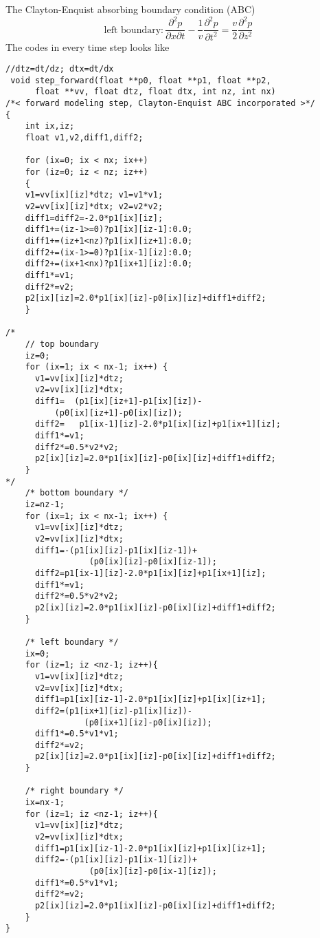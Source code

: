 The Clayton-Enquist absorbing boundary condition (ABC) \citep{Clayton_1977_ABC}
\begin{equation}
 \mbox{left boundary}:\frac{\partial^2 p}{\partial x\partial t}-\frac{1}{v}\frac{\partial^2 p}{\partial t^2}=\frac{v}{2}\frac{\partial^2 p}{\partial z^2}
\end{equation}
The codes in every time step looks like
\lstset{language=c,numbers=left,numberstyle=\tiny,showstringspaces=false,frame=single}
\begin{lstlisting}
//dtz=dt/dz; dtx=dt/dx
 void step_forward(float **p0, float **p1, float **p2, 
      float **vv, float dtz, float dtx, int nz, int nx)
/*< forward modeling step, Clayton-Enquist ABC incorporated >*/
{
    int ix,iz;
    float v1,v2,diff1,diff2;

    for (ix=0; ix < nx; ix++) 
    for (iz=0; iz < nz; iz++) 
    {
    v1=vv[ix][iz]*dtz; v1=v1*v1;
    v2=vv[ix][iz]*dtx; v2=v2*v2;
    diff1=diff2=-2.0*p1[ix][iz];
    diff1+=(iz-1>=0)?p1[ix][iz-1]:0.0;
    diff1+=(iz+1<nz)?p1[ix][iz+1]:0.0;
    diff2+=(ix-1>=0)?p1[ix-1][iz]:0.0;
    diff2+=(ix+1<nx)?p1[ix+1][iz]:0.0;
    diff1*=v1;
    diff2*=v2;
    p2[ix][iz]=2.0*p1[ix][iz]-p0[ix][iz]+diff1+diff2;
    }

/*
    // top boundary 
    iz=0;
    for (ix=1; ix < nx-1; ix++) { 
	  v1=vv[ix][iz]*dtz; 
	  v2=vv[ix][iz]*dtx;
	  diff1=  (p1[ix][iz+1]-p1[ix][iz])-
		  (p0[ix][iz+1]-p0[ix][iz]);
	  diff2=   p1[ix-1][iz]-2.0*p1[ix][iz]+p1[ix+1][iz];
	  diff1*=v1;
	  diff2*=0.5*v2*v2;
	  p2[ix][iz]=2.0*p1[ix][iz]-p0[ix][iz]+diff1+diff2;
    }
*/
    /* bottom boundary */
    iz=nz-1;
    for (ix=1; ix < nx-1; ix++) { 
	  v1=vv[ix][iz]*dtz; 
	  v2=vv[ix][iz]*dtx;
	  diff1=-(p1[ix][iz]-p1[ix][iz-1])+
                 (p0[ix][iz]-p0[ix][iz-1]);
	  diff2=p1[ix-1][iz]-2.0*p1[ix][iz]+p1[ix+1][iz];
	  diff1*=v1;
	  diff2*=0.5*v2*v2;
	  p2[ix][iz]=2.0*p1[ix][iz]-p0[ix][iz]+diff1+diff2;
    }

    /* left boundary */
    ix=0;
    for (iz=1; iz <nz-1; iz++){ 
	  v1=vv[ix][iz]*dtz; 
	  v2=vv[ix][iz]*dtx;
	  diff1=p1[ix][iz-1]-2.0*p1[ix][iz]+p1[ix][iz+1];
	  diff2=(p1[ix+1][iz]-p1[ix][iz])-
                (p0[ix+1][iz]-p0[ix][iz]);
	  diff1*=0.5*v1*v1;
	  diff2*=v2;
	  p2[ix][iz]=2.0*p1[ix][iz]-p0[ix][iz]+diff1+diff2;
    }

    /* right boundary */
    ix=nx-1;
    for (iz=1; iz <nz-1; iz++){ 
	  v1=vv[ix][iz]*dtz; 
	  v2=vv[ix][iz]*dtx;
	  diff1=p1[ix][iz-1]-2.0*p1[ix][iz]+p1[ix][iz+1];
	  diff2=-(p1[ix][iz]-p1[ix-1][iz])+
                 (p0[ix][iz]-p0[ix-1][iz]);
	  diff1*=0.5*v1*v1;
	  diff2*=v2;
	  p2[ix][iz]=2.0*p1[ix][iz]-p0[ix][iz]+diff1+diff2;
    }  
}
\end{lstlisting}

